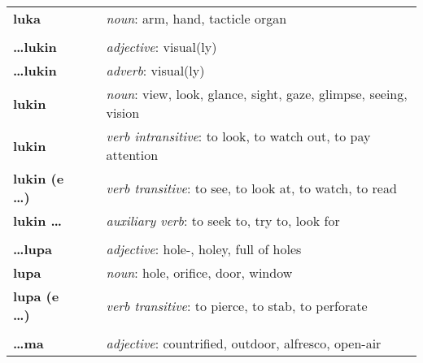 \begin{supertabular}{p{2,5cm}|ll}
    \textbf{luka}                &  & \textit{noun}: arm, hand, tacticle organ                                                                   \\
                                 &  &                                                                                                            \\ %
    \textbf{\dots lukin}         &  & \textit{adjective}: visual(ly)                                                                             \\
    \textbf{\dots lukin}         &  & \textit{adverb}: visual(ly)                                                                                \\
    \textbf{lukin}               &  & \textit{noun}: view, look, glance, sight, gaze, glimpse, seeing, vision                                    \\
    \textbf{lukin}               &  & \textit{verb intransitive}: to look, to watch out, to pay attention                                        \\
    \textbf{lukin (e \dots)}     &  & \textit{verb transitive}: to see, to look at, to watch, to read                                            \\
    \textbf{lukin \dots}         &  & \textit{auxiliary verb}: to seek to, try to, look for                                                      \\
                                 &  &                                                                                                            \\ %
    \textbf{\dots lupa}          &  & \textit{adjective}: hole-, holey, full of holes                                                            \\
    \textbf{lupa}                &  & \textit{noun}: hole, orifice, door, window                                                                 \\
    \textbf{lupa (e \dots)}      &  & \textit{verb transitive}: to pierce, to stab, to perforate                                                 \\
                                 &  &                                                                                                            \\ %
    \textbf{\dots ma}            &  & \textit{adjective}: countrified, outdoor, alfresco, open-air                                               \\

\end{supertabular}
